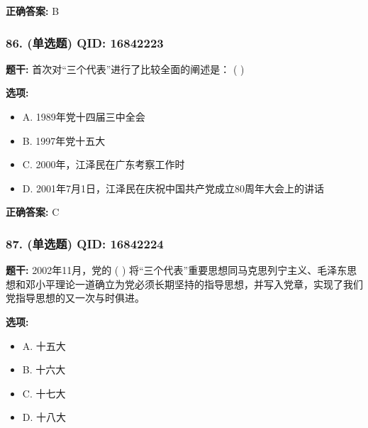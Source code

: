 \documentclass[12pt,UTF8]{ctexart}
\begin{document}
\textbf{正确答案:}
B

\vspace{0.3em}\hrulefill\vspace{0.7em}

\subsubsection*{86. (单选题) \small QID: 16842223}

\textbf{题干:}
首次对“三个代表”进行了比较全面的阐述是： ( )

\textbf{选项:}
\begin{itemize}[leftmargin=*]

  \item A. 1989年党十四届三中全会

  \item B. 1997年党十五大

  \item C. 2000年，江泽民在广东考察工作时

  \item D. 2001年7月1日，江泽民在庆祝中国共产党成立80周年大会上的讲话

\end{itemize}

\textbf{正确答案:}
C

\vspace{0.3em}\hrulefill\vspace{0.7em}

\subsubsection*{87. (单选题) \small QID: 16842224}

\textbf{题干:}
2002年11月，党的 ( ) 将“三个代表”重要思想同马克思列宁主义、毛泽东思想和邓小平理论一道确立为党必须长期坚持的指导思想，并写入党章，实现了我们党指导思想的又一次与时俱进。

\textbf{选项:}
\begin{itemize}[leftmargin=*]

  \item A. 十五大

  \item B. 十六大

  \item C. 十七大

  \item D. 十八大

\end{itemize}
\end{document}
